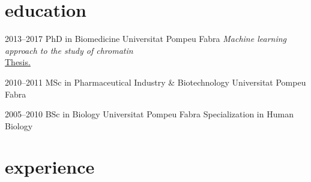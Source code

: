 \documentclass[]{friggeri-cv} %
\begin{document}
\section{education}

\begin{entrylist}

\entry
{2013--2017}
{PhD {\normalfont in Biomedicine}}
{Universitat Pompeu Fabra}
{\emph{Machine learning approach to the study of chromatin}\\
\href{https://www.tdx.cat/handle/10803/565685}{{\FA \faExternalLink} Thesis.}}

\entry
{2010--2011}
{MSc {\normalfont in Pharmaceutical Industry \& Biotechnology}}
{Universitat Pompeu Fabra}
{}

\entry
{2005--2010}
{BSc {\normalfont in Biology}}
{Universitat Pompeu Fabra}
{Specialization in Human Biology}

\end{entrylist}


\section{experience}
\end{document}
